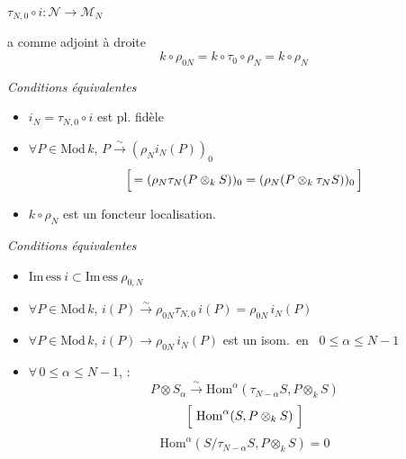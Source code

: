 \documentclass[11pt,a4paper]{article}
\begin{document}
$\tau_{N,0} \circ i : \mathcal{N} \longrightarrow \mathcal{M}_N$

a comme adjoint à droite
\[
  k \circ \rho_{0N} = k \circ \tau_0 \circ \rho_N = k \circ \rho_N
\]

\emph{Conditions équivalentes}
\begin{itemize}
  \item[a)] $i_N = \tau_{N,0} \circ i$ est pl. fidèle
  \item[b)] $\forall P \in \mathrm{Mod}\,k$, $P \xrightarrow{\sim} (\rho_N i_N(P))_0$
    \[
      \Bigl[\, = (\rho_N \tau_N(P \otimes_k S))_0 = (\rho_N(P \otimes_k \tau_N S))_0 \,\Bigr]
    \]
  \item[c)] $k \circ \rho_N$ est un foncteur localisation.
\end{itemize}

\emph{Conditions équivalentes}
\begin{itemize}
  \item[a')]  $\mathrm{Im\,ess}\ i \subset \mathrm{Im\,ess}\ \rho_{0,N}$ 
  \item[b')] $\forall P \in \mathrm{Mod}\,k$, $i(P) \xrightarrow{\sim} \rho_{0N} \tau_{N,0}\, i(P) = \rho_{0N}\, i_N(P)$
  \item[b' bis)] $\forall P \in \mathrm{Mod}\,k$, $i(P) \longrightarrow \rho_{0N}\, i_N(P)$ est un isom.\ en \ $0 \leq \alpha \leq N-1$
  \item[c')]  $\forall\, 0 \leq \alpha \leq N-1$,  :
    \[
      P \otimes S_{\alpha} \xrightarrow{\ \sim\ } \mathrm{Hom}^{\alpha}(\tau_{N-\alpha} S, P \otimes_k S)
    \]
    \[
      \Bigl[\ \mathrm{Hom}^{\alpha}(S, P \otimes_k S) \ \Bigr]
    \]
    \[
      \mathrm{Hom}^{\alpha}(S/\tau_{N-\alpha} S, P \otimes_k S) = 0
    \]
\end{itemize}
\marginal{\struck{\ill{}}}

\end{document}
